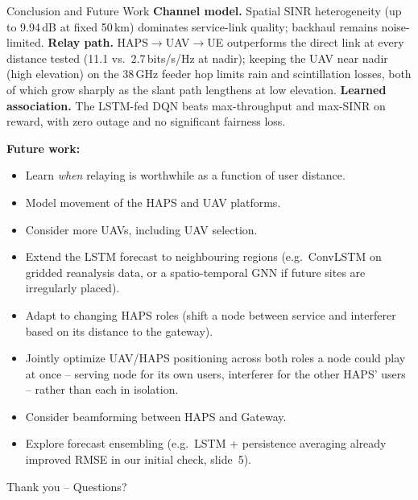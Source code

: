 \documentclass[aspectratio=169]{beamer}
\begin{document}
\begin{frame}{Conclusion and Future Work}
\scriptsize
\textbf{Channel model.} Spatial SINR heterogeneity (up to 9.94\,dB at
fixed 50\,km) dominates service-link quality; backhaul remains
noise-limited. \quad
\textbf{Relay path.} HAPS$\to$UAV$\to$UE outperforms the direct link at
every distance tested (11.1 vs.\ 2.7\,bits/s/Hz at nadir); keeping the
UAV near nadir (high elevation) on the 38\,GHz feeder hop limits rain
and scintillation losses, both of which grow sharply as the slant path
lengthens at low elevation. \quad
\textbf{Learned association.} The LSTM-fed DQN beats max-throughput and
max-SINR on reward, with zero outage and no significant fairness loss.

\vspace{2mm}
\textbf{Future work:}
\begin{itemize}\setlength{\itemsep}{0pt}
  \item Learn \emph{when} relaying is worthwhile as a function of user distance.
  \item Model movement of the HAPS and UAV platforms.
  \item Consider more UAVs, including UAV selection.
  \item Extend the LSTM forecast to neighbouring regions (e.g.\ ConvLSTM
        on gridded reanalysis data, or a spatio-temporal GNN if future
        sites are irregularly placed).
  \item Adapt to changing HAPS roles (shift a node between service and
        interferer based on its distance to the gateway).
  \item Jointly optimize UAV/HAPS positioning across both roles a node
        could play at once -- serving node for its own users, interferer
        for the other HAPS' users -- rather than each in isolation.
  \item Consider beamforming between HAPS and Gateway.
  \item Explore forecast ensembling (e.g.\ LSTM + persistence averaging
        already improved RMSE in our initial check, slide~5).
\end{itemize}

\vspace{2mm}
\centering \large Thank you -- Questions?
\end{frame}
\end{document}
